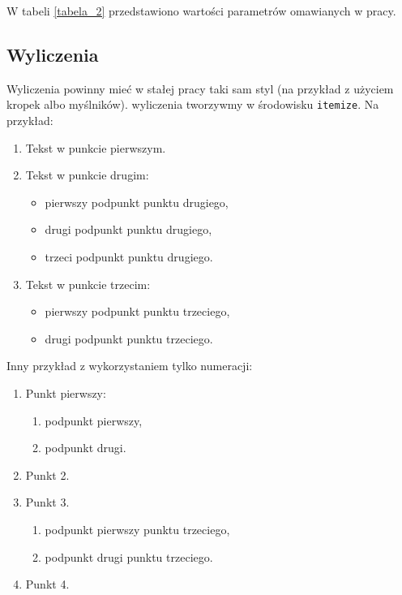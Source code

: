\documentclass[a4paper,12pt,twoside,polish]{book}
\theoremstyle{definition}
\theoremstyle{plain}
\theoremstyle{definition}
\begin{document}
W tabeli \ref{tabela_2} przedstawiono wartości parametrów omawianych w pracy.


\subsection{Wyliczenia}

Wyliczenia powinny mieć w stałej pracy taki sam styl (na przykład z użyciem kropek albo myślników). wyliczenia tworzywmy w środowisku \verb+itemize+. Na przykład:

\begin{enumerate}
\item Tekst w punkcie pierwszym.
\item Tekst w punkcie drugim:
        \begin{itemize}
        \item pierwszy podpunkt punktu drugiego,
        \item drugi podpunkt punktu drugiego,
        \item trzeci podpunkt punktu drugiego.
        \end{itemize}
\item Tekst w punkcie trzecim:
        \begin{itemize}
        \item pierwszy podpunkt punktu trzeciego,
        \item drugi podpunkt punktu trzeciego.
        \end{itemize}
\end{enumerate}

\noindent Inny przykład z wykorzystaniem tylko numeracji:

\begin{enumerate}
\item Punkt pierwszy:
   \begin{enumerate}
   \item podpunkt pierwszy,
   \item podpunkt drugi.
   \end{enumerate}
\item Punkt 2.
\item Punkt 3.
\begin{enumerate}
   \item podpunkt pierwszy punktu trzeciego,
   \item podpunkt drugi punktu trzeciego.
   \end{enumerate}
\item Punkt 4.
\end{enumerate}
\end{document}
